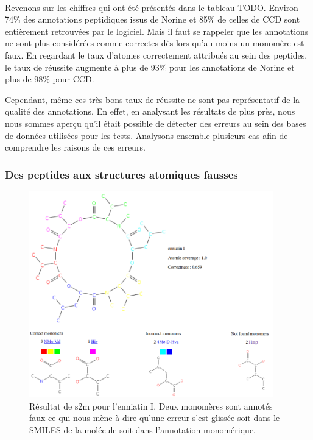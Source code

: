 \documentclass[12pt,french,twoside]{report}
\begin{document}
\paragraph{}Revenons sur les chiffres qui ont été présentés dans le tableau TODO.
Environ 74\% des annotations peptidiques issus de Norine et 85\% de celles de CCD sont entièrement retrouvées par le logiciel.
Mais il faut se rappeler que les annotations ne sont plus considérées comme correctes dès lors qu'au moins un monomère est faux.
En regardant le taux d'atomes correctement attribués au sein des peptides, le taux de réussite augmente à plus de 93\% pour les annotations de Norine et plus de 98\% pour CCD.

Cependant, même ces très bons taux de réussite ne sont pas représentatif de la qualité des annotations.
En effet, en analysant les résultats de plus près, nous nous sommes aperçu qu'il était possible de détecter des erreurs au sein des bases de données utilisées pour les tests.
Analysons ensemble plusieurs cas afin de comprendre les raisons de ces erreurs.


\subsubsection{Des peptides aux structures atomiques fausses}

\begin{figure}[!h]
  \begin{center}
    \includegraphics[width=400px]{Figures/s2m/results/s2m_enniati.png}
    \caption{\label{s2m_enniati}Résultat de s2m pour l'enniatin I.
    Deux monomères sont annotés faux ce qui nous mène à dire qu'une erreur s'est glissée soit dans le SMILES de la molécule soit dans l'annotation monomérique.}
  \end{center}
\end{figure}
\end{document}
